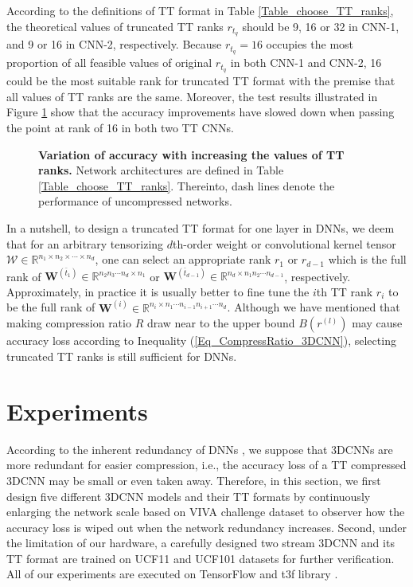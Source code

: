 \documentclass[a4paper,fleqn]{cas-dc}
\begin{document}
According to the definitions of TT format in Table \ref{Table_choose_TT_ranks}, the theoretical values of truncated TT ranks \(r_{t_{q}}\) should be 9, 16 or 32 in CNN-1, and 9 or 16 in CNN-2, respectively. Because \(r_{t_{q}}=16\) occupies the most proportion of all feasible values of original \(r_{t_{q}}\) in both CNN-1 and CNN-2, 16 could be the most suitable rank for truncated TT format with the premise that all values of TT ranks are the same. Moreover, the test results illustrated in Figure \ref{Fig_tt_ranks_test} show that the accuracy improvements have slowed down when passing the point at rank of 16 in both two TT CNNs.

\begin{figure}
\centering
{}
\caption{\textbf{Variation of accuracy with increasing the values of TT ranks.} Network architectures are defined in Table \ref{Table_choose_TT_ranks}. Thereinto, dash lines denote the performance of uncompressed networks.}
\label{Fig_tt_ranks_test}
\end{figure}

In a nutshell, to design a truncated TT format for one layer in DNNs, we deem that for an arbitrary tensorizing \(d\)th-order weight or convolutional kernel tensor \(\bm{\mathcal{W}} \in \mathbb{R}^{n_1 \times n_2 \times \cdots \times n_d}\), one can select an appropriate rank \(r_1\) or \(r_{d-1}\) which is the full rank of \(\bm{W}^{(\bar{t}_{1})} \in \mathbb{R}^{n_{2}n_{3} \cdots n_{d} \times n_{1}}\) or \(\bm{W}^{(\bar{t}_{d-1})} \in \mathbb{R}^{n_{d} \times n_{1}n_{2} \cdots n_{d-1}}\), respectively. Approximately, in practice it is usually better to fine tune the \(i\)th TT rank \(r_i\) to be the full rank of \(\bm{W}^{(i)} \in \mathbb{R}^{n_i \times n_1 \cdots n_{i-1}n_{i+1} \cdots n_{d}}\). Although we have mentioned that making compression ratio \(R\) draw near to the upper bound \(B(r^{(l)})\) may cause accuracy loss according to Inequality (\ref{Eq_CompressRatio_3DCNN}), selecting truncated TT ranks is still sufficient for DNNs. 




\section{Experiments}\label{sec:Exp}

According to the inherent redundancy of DNNs \citep{Denil_2013_Redundancy}, we suppose that 3DCNNs are more redundant for easier compression, i.e., the accuracy loss of a TT compressed 3DCNN may be small or even taken away. Therefore, in this section, we first design five different 3DCNN models and their TT formats by continuously enlarging the network scale based on VIVA challenge dataset to observer how the accuracy loss is wiped out when the network redundancy increases. Second, under the limitation of our hardware, a carefully designed two stream 3DCNN and its TT format are trained on UCF11 and UCF101 datasets for further verification. All of our experiments are executed on TensorFlow and t3f library \citep{Novikov_2018_t3f}.
\end{document}
